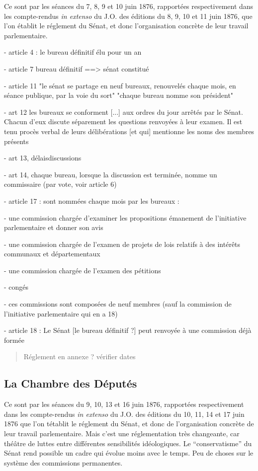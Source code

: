 Ce sont par les séances du 7, 8, 9 et 10 juin 1876, rapportées respectivement dans les compte-rendus \textit{in extenso} du J.O. des éditions du 8, 9, 10 et 11 juin 1876, que l'on établit le réglement du Sénat, et donc l'organisation concrète de leur travail parlementaire.

- article 4 : le bureau définitif élu pour un an

- article 7 bureau définitif ==> sénat constitué

- article 11 "le sénat se partage en neuf bureaux, renouvelés chaque mois, en séance publique, par la voie du sort" "chaque bureau nomme son président"

- art 12 les bureaux se conforment [...] aux ordres du jour arrêtés par le Sénat. Chacun d'eux discute séparement les questions renvoyées à leur examen. 
Il est tenu procès verbal de leurs délibérations [et qui] mentionne les noms des membres présents

- art 13, délaisdiscussions

- art 14, chaque bureau, lorsque la discussion est terminée, nomme un commissaire (par vote, voir article 6)

- article 17 : sont nommées chaque mois par les bureaux :

- une commission chargée d'examiner les propositions émanement de l'initiative parlementaire et donner son avis

- une commission chargée de l'examen de projets de lois relatifs à des intérêts communaux et départementaux

- une commission chargée de l'examen des pétitions

- congés

- ces commissions sont composées de neuf membres (sauf la commission de l'initiative parlementaire qui en a 18)

- article 18 : Le Sénat [le bureau définitif ?] peut renvoyée à une commission déjà formée


\begin{quote} Réglement en annexe ? vérifier dates\end{quote}

\subsection{La Chambre des Députés}
Ce sont par les séances du 9, 10, 13 et 16 juin 1876, rapportées respectivement dans les compte-rendus \textit{in extenso} du J.O. des éditions du 10, 11, 14 et 17 juin 1876 que l'on tétablit le réglement du Sénat, et donc de l'organisation concrète de leur travail parlementaire. Mais c'est une réglementation très changeante, car théâtre de luttes entre différentes sensibilités idéologiques. Le \enquote{conservatisme} du Sénat rend possible un cadre qui évolue moins avec le temps. Peu de choses sur le système des commissions permanentes.

